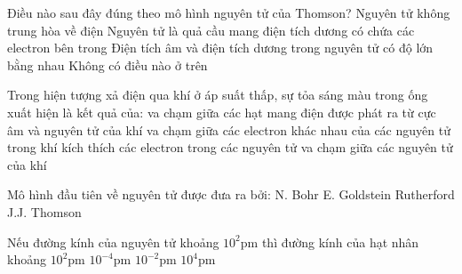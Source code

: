 \begin{ex}
	Điều nào sau đây đúng theo mô hình nguyên tử của Thomson?
	\choice
	{%
		Nguyên tử không trung hòa về điện
	}
	{%
		\True Nguyên tử là quả cầu mang điện tích dương có chứa các electron bên trong
	}
	{%
		Điện tích âm và điện tích dương trong nguyên tử có độ lớn bằng nhau
	}
	{%
		Không có điều nào ở trên
	}
\end{ex}

\begin{ex}
	Trong hiện tượng xả điện qua khí ở áp suất thấp, sự tỏa sáng màu trong ống xuất hiện là kết quả của:
	\choice
	{%
		\True va chạm giữa các hạt mang điện được phát ra từ cực âm và nguyên tử của khí
	}
	{%
		va chạm giữa các electron khác nhau của các nguyên tử trong khí
	}
	{%
		kích thích các electron trong các nguyên tử
	}
	{%
		va chạm giữa các nguyên tử của khí
	}
\end{ex}

\begin{ex}
	Mô hình đầu tiên về nguyên tử được đưa ra bởi:
	\choice
	{%
		N. Bohr
	}
	{%
		E. Goldstein
	}
	{%
		Rutherford
	}
	{%
		\True J.J. Thomson
	}
\end{ex}

\begin{ex}
	Nếu đường kính của nguyên tử khoảng $10^2 \mathrm{pm}$ thì đường kính của hạt nhân khoảng
	\choice
	{%
		$10^2 \mathrm{pm}$
	}
	{%
		$10^{-4} \mathrm{pm}$
	}
	{%
		\True	$10^{-2} \mathrm{pm}$
	}
	{
		$10^4 \mathrm{pm}$
	}
\end{ex}

